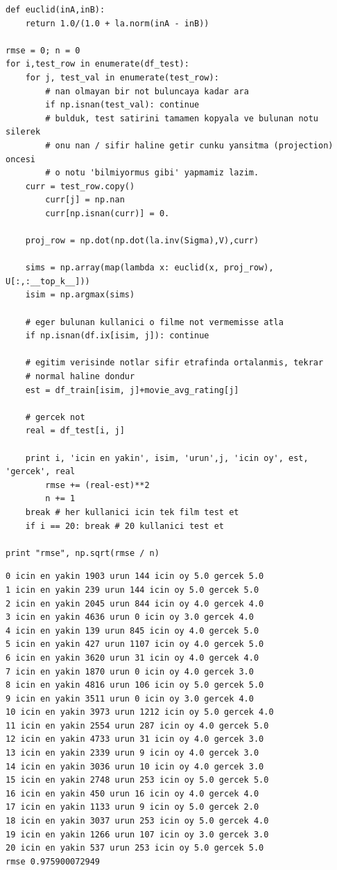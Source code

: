 \documentclass[12pt,fleqn]{article}\usepackage{../../common}
\begin{document}
\begin{verbatim}
def euclid(inA,inB):
    return 1.0/(1.0 + la.norm(inA - inB))
    
rmse = 0; n = 0
for i,test_row in enumerate(df_test):
    for j, test_val in enumerate(test_row):
        # nan olmayan bir not buluncaya kadar ara
        if np.isnan(test_val): continue	
        # bulduk, test satirini tamamen kopyala ve bulunan notu silerek
        # onu nan / sifir haline getir cunku yansitma (projection) oncesi
        # o notu 'bilmiyormus gibi' yapmamiz lazim. 
	curr = test_row.copy()
        curr[j] = np.nan
        curr[np.isnan(curr)] = 0.

	proj_row = np.dot(np.dot(la.inv(Sigma),V),curr)

	sims = np.array(map(lambda x: euclid(x, proj_row), U[:,:__top_k__]))
	isim = np.argmax(sims)

	# eger bulunan kullanici o filme not vermemisse atla
	if np.isnan(df.ix[isim, j]): continue

	# egitim verisinde notlar sifir etrafinda ortalanmis, tekrar
	# normal haline dondur
	est = df_train[isim, j]+movie_avg_rating[j]

	# gercek not
	real = df_test[i, j]

	print i, 'icin en yakin', isim, 'urun',j, 'icin oy', est, 'gercek', real
        rmse += (real-est)**2
        n += 1
	break # her kullanici icin tek film test et
    if i == 20: break # 20 kullanici test et

print "rmse", np.sqrt(rmse / n)
\end{verbatim}

\begin{verbatim}
0 icin en yakin 1903 urun 144 icin oy 5.0 gercek 5.0
1 icin en yakin 239 urun 144 icin oy 5.0 gercek 5.0
2 icin en yakin 2045 urun 844 icin oy 4.0 gercek 4.0
3 icin en yakin 4636 urun 0 icin oy 3.0 gercek 4.0
4 icin en yakin 139 urun 845 icin oy 4.0 gercek 5.0
5 icin en yakin 427 urun 1107 icin oy 4.0 gercek 5.0
6 icin en yakin 3620 urun 31 icin oy 4.0 gercek 4.0
7 icin en yakin 1870 urun 0 icin oy 4.0 gercek 3.0
8 icin en yakin 4816 urun 106 icin oy 5.0 gercek 5.0
9 icin en yakin 3511 urun 0 icin oy 3.0 gercek 4.0
10 icin en yakin 3973 urun 1212 icin oy 5.0 gercek 4.0
11 icin en yakin 2554 urun 287 icin oy 4.0 gercek 5.0
12 icin en yakin 4733 urun 31 icin oy 4.0 gercek 3.0
13 icin en yakin 2339 urun 9 icin oy 4.0 gercek 3.0
14 icin en yakin 3036 urun 10 icin oy 4.0 gercek 3.0
15 icin en yakin 2748 urun 253 icin oy 5.0 gercek 5.0
16 icin en yakin 450 urun 16 icin oy 4.0 gercek 4.0
17 icin en yakin 1133 urun 9 icin oy 5.0 gercek 2.0
18 icin en yakin 3037 urun 253 icin oy 5.0 gercek 4.0
19 icin en yakin 1266 urun 107 icin oy 3.0 gercek 3.0
20 icin en yakin 537 urun 253 icin oy 5.0 gercek 5.0
rmse 0.975900072949
\end{verbatim}
\end{document}
